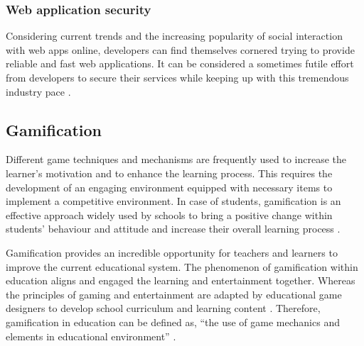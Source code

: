 \subsubsection{Web application security}
Considering current trends and the increasing popularity of social interaction with web apps online, developers can find themselves cornered trying to provide reliable and fast web applications. It can be considered a sometimes futile effort from developers to secure their services while keeping up with this tremendous industry pace \cite{bhor2016analysisofweb}. 

\subsection{Gamification}
Different game techniques and mechanisms are frequently used to increase the learner's motivation and to enhance the learning process. This requires the development of an engaging environment equipped with necessary items to implement a competitive environment. In case of students, gamification is an effective approach widely used by schools to bring a positive change within students' behaviour and attitude and increase their overall learning process \cite{kiryakova2014gamification}. \par \vspace{1.5mm}
Gamification provides an incredible opportunity for teachers and learners to improve the current educational system. The phenomenon of gamification within education aligns and engaged the learning and entertainment together. Whereas the principles of gaming and entertainment are adapted by educational game designers to develop school curriculum and learning content \cite{kurshan2016gamification}. Therefore, gamification in education can be defined as, \enquote{the use of game mechanics and elements in educational environment} \cite[p.~2]{kiryakova2014gamification}.

